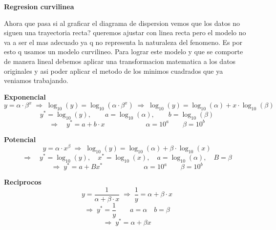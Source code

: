 \documentclass[10pt,a4paper]{article}
\begin{document}
{\large\bfseries Regresion curvilinea}
\vspace{2pt}

Ahora que pasa si al graficar el diagrama de dispersion vemos que los datos no siguen una trayectoria recta? queremos ajustar con linea recta pero el modelo no va a ser el mas adecuado ya q no representa la naturaleza del fenomeno. Es por esto q usamos un modelo curvilineo. Para lograr este modelo y que se comporte de manera lineal debemos aplicar una transformacion matematica a los datos originales y asi poder aplicar el metodo de los minimos cuadrados que ya veniamos trabajando.

\textbf{Exponencial}
\[
y = \alpha\cdot\beta^x
\;\Rightarrow\;
\log_{10}(y) = \log_{10}(\alpha\cdot\beta^x)
\;\Rightarrow\;
\log_{10}(y) = \log_{10}(\alpha) + x\cdot\log_{10}(\beta)
\]
\[
y^{*} = \log_{10}(y), \qquad a = \log_{10}(\alpha), \qquad b = \log_{10}(\beta)
\]
\[
\Rightarrow \quad y^{*} = a + b\cdot x
\qquad\qquad\qquad
\alpha = 10^a \qquad \beta = 10^b
\]

\textbf{Potencial}
\[
y = \alpha\cdot x^{\beta}
\;\Rightarrow\;
\log_{10}(y) = \log_{10}(\alpha) + \beta\cdot\log_{10}(x)
\]
\[
\Rightarrow \quad y^{*} = \log_{10}(y), \quad x^{*} = \log_{10}(x), \quad a = \log_{10}(\alpha), \quad B = \beta
\]
\[
\Rightarrow \; y^{*} = a + Bx^{*}
\qquad\qquad\qquad
\alpha = 10^a \qquad \beta = 10^b
\]

\textbf{Reciprocos}
\[
y = \frac{1}{\alpha+\beta\cdot x}
\;\Rightarrow\;
\frac{1}{y} = \alpha + \beta\cdot x
\]
\[
\Rightarrow \; y^{*} = \frac{1}{y} \qquad a=\alpha \quad b=\beta
\]
\[
\Rightarrow \; y^{*} = \alpha + \beta x
\]
\end{document}
